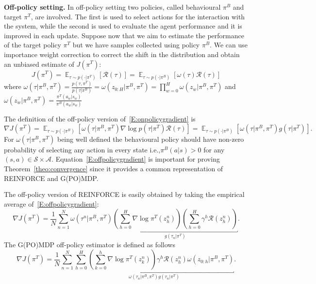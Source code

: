 \documentclass{article}
\makeatletter
\theoremstyle{remark}
\theoremstyle{definition}
\DeclareRobustCommand{\eg}{e.g.,\@\xspace}
\DeclareRobustCommand{\ie}{i.e.,\@\xspace}
\newcommand{\todopir}[1]{\todo[color=blued, inline]{\small #1}}
\DeclareMathOperator*{\EV}{\mathbb{E}}
\newcommand{\EVV}[2][\ppvect \in \ppspace]{\EV_{#1}\left[{#2}\right]}
\newcommand{\Reward}{\mathcal{R}}
\makeatother
\begin{document}
\textbf{Off-policy setting.}
In off-policy setting two policies, called behavioural $\pi^B$ and target $\pi^T$, are involved.
The first is used to select actions for the interaction with the system, while the second is used to evaluate the agent performance and it is improved in each update.
Suppose now that we aim to estimate the performance of the target policy $\pi^T$ but we have samples collected using policy $\pi^B$.
We can use importance weight correction to correct the shift in the distribution and obtain an unbiased estimate of $J(\pi^T)$:
\[
        J(\pi^T) = \EVV[\tau \sim p(\cdot|\pi^T)]{\mathcal{R}(\tau)} = \EVV[\tau \sim p(\cdot|\pi^B)]{\omega(\tau) \mathcal{R}(\tau)}
\]
where $\omega(\tau|\pi^B,\pi^T) = \frac{p(\tau,\pi^T)}{p(\tau|\pi^B)} = \omega(z_{0:H}|\pi^B,\pi^T) = \prod_{w=0}^{H} \omega(z_w|\pi^B,\pi^T)$ and $\omega(z_w|\pi^B,\pi^T) = \frac{\pi^T(a_w|s_w)}{\pi^B(a_w|s_w)}$

The definition of the off-policy version of~\eqref{E:onpolicygradient} is~\citep[\eg][]{jurvcivcek2012reinforcement}
\begin{equation}\label{E:offpolicygradient}
        \nabla J(\pi^T) = \EVV[\tau \sim p(\cdot|\pi^B)]{\omega(\tau|\pi^B,\pi^T) \nabla \log p(\tau|\pi^T) \mathcal{R}(\tau)} = \EVV[\tau \sim p(\cdot|\pi^B)]{\omega(\tau|\pi^B,\pi^T) g(\tau|\pi^T)}. 
\end{equation}
For $\omega(\tau|\pi^B,\pi^T)$ being well defined the behavioural policy should have non-zero probability of selecting any action in every state \ie $\pi^B(a|s) > 0$ for any $(s,a)\in \mathcal{S} \times \mathcal{A}$.
Equation~\ref{E:offpolicygradient} is important for proving Theorem~\ref{theo:convergence} since it provides a common representation of REINFORCE and G(PO)MDP.

The off-policy version of REINFORCE is easily obtained by taking the empirical average of~\eqref{E:offpolicygradient}:
\[
        \nabla J(\pi^T) = \frac{1}{N} \sum_{n=1}^{N} \omega(\tau^n|\pi^B, \pi^T)
        \underbracket{
                \left(\sum_{h=0}^{H} \nabla \log \pi^{T}(z_h^n) \right)\left(\sum_{h=0}^{H}\gamma^h \Reward(z_h^n)\right)
        }_{g(\tau_n|\pi^T)}.
\]
%
The G(PO)MDP off-policy estimator is defined as follows
\[
        \nabla J(\pi^T) = \frac{1}{N} \sum_{n=1}^{N}
        \underbracket{
                \sum_{h=0}^H \left(\sum_{k=0}^h \nabla \log\pi^T(z_k^n)\right) \gamma^h \Reward(z_h^n) \omega(z_{0:h}|\pi^B,\pi^T)
        }_{\omega(\tau_n|\pi^B,\pi^T)g(\tau_n|\pi^T)}.
\]
\end{document}
